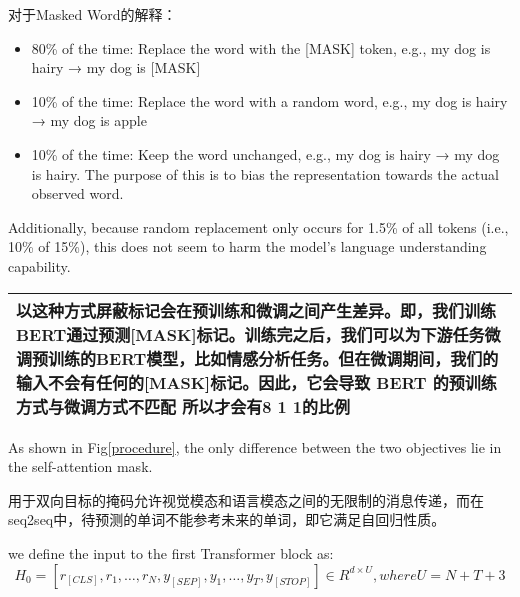 \documentclass{article}
\begin{document}
\begin{sloppypar}
      对于Masked Word的解释\cite{devlin2019bert}：
      \begin{itemize}
            \item 80\% of the time: Replace the word with the [MASK] token, e.g., my dog is hairy → my dog is [MASK]
            \item 10\% of the time: Replace the word with a random word, e.g., my dog is hairy → my dog is apple
            \item 10\% of the time: Keep the word unchanged, e.g., my dog is hairy → my dog is hairy. The purpose of this is to bias the representation towards the actual observed word.
      \end{itemize}
      Additionally, because random replacement only occurs for 1.5\% of all tokens (i.e., 10\% of 15\%), this does not seem to harm the model’s language understanding capability.\cite{devlin2019bert}
      \begin{table*}[!htbp]
            \renewcommand\arraystretch{2}

            \centering
            \begin{tabularx}{\textwidth}{|X|}
                  \hline

                  \indent 以这种方式屏蔽标记会在预训练和微调之间产生差异。即，我们训练BERT通过预测[MASK]标记。训练完之后，我们可以为下游任务微调预训练的BERT模型，比如情感分析任务。但在微调期间，我们的输入不会有任何的[MASK]标记。因此，它会导致 BERT 的预训练方式与微调方式不匹配
                  所以才会有8 1 1的比例 \\
                  \hline
            \end{tabularx}%
            \label{tab:addlabel}%

      \end{table*}%



      As shown in Fig\ref{procedure}, the only difference between the two objectives lie in the self-attention mask.

      用于双向目标的掩码允许视觉模态和语言模态之间的无限制的消息传递，而在seq2seq中，待预测的单词不能参考未来的单词，即它满足自回归性质。

      we define the input to the first Transformer block as:
      \begin{equation}
            H_0 = [r_{[CLS]}, r_1, \dots, r_N, y_{[SEP]}, y_1, \dots, y_T, y_{[STOP]}] \in R^{d \times U},where U=N+T+3
            \label{auto-regressive}
      \end{equation}


\end{sloppypar}
\end{document}
